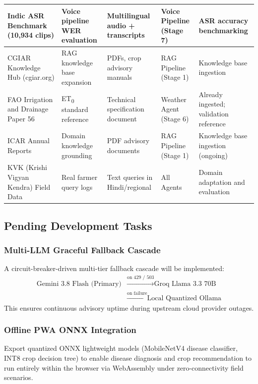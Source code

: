 \documentclass[12pt,a4paper]{article}
\begin{document}
\begin{longtable}{|p{2.9cm}|p{2.85cm}|p{2.4cm}|p{2.4cm}|p{2.85cm}|}
\hline
Indic ASR Benchmark~\cite{indicasr2025} (10,934 clips) & Voice pipeline WER evaluation & Multilingual audio + transcripts & Voice Pipeline (Stage 7) & ASR accuracy benchmarking \\
\hline
CGIAR Knowledge Hub (cgiar.org) & RAG knowledge base expansion & PDFs, crop advisory manuals & RAG Pipeline (Stage 1) & Knowledge base ingestion \\
\hline
FAO Irrigation and Drainage Paper 56~\cite{fao56penman1998} & ET\textsubscript{0} standard reference & Technical specification document & Weather Agent (Stage 6) & Already ingested; validation reference \\
\hline
ICAR Annual Reports~\cite{icar2023} & Domain knowledge grounding & PDF advisory documents & RAG Pipeline (Stage 1) & Knowledge base ingestion (ongoing) \\
\hline
KVK (Krishi Vigyan Kendra) Field Data & Real farmer query logs & Text queries in Hindi/regional & All Agents & Domain adaptation and evaluation \\
\hline
\end{longtable}
\endgroup

\subsection{Pending Development Tasks}

\subsubsection{Multi-LLM Graceful Fallback Cascade}
A circuit-breaker-driven multi-tier fallback cascade will be implemented:
\begin{equation*}
\begin{split}
\text{Gemini 3.8 Flash (Primary)} 
&\xrightarrow{\text{on 429 / 503}} \text{Groq Llama 3.3 70B} \\
&\xrightarrow{\text{on failure}} \text{Local Quantized Ollama}
\end{split}
\end{equation*}
This ensures continuous advisory uptime during upstream cloud provider outages.

\subsubsection{Offline PWA ONNX Integration}
Export quantized ONNX lightweight models (MobileNetV4 disease classifier, INT8 crop decision tree) to enable disease diagnosis and crop recommendation to run entirely within the browser via WebAssembly under zero-connectivity field scenarios.
\end{document}

